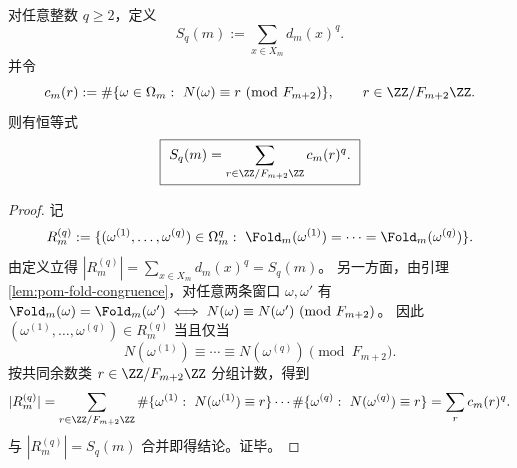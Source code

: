 \begin{proposition}\label{prop:pom-moment-congruence-q}
对任意整数 \(q\ge 2\)，定义
$$
S_q(m):=\sum_{x\in X_m} d_m(x)^q.
$$
并令
$$
c_m(r):=\#\{\omega\in\Omega_m:\ N(\omega)\equiv r\ (\mathrm{mod}\ F_{m+2})\},\qquad r\in\ZZ/F_{m+2}\ZZ.
$$
则有恒等式
$$
\boxed{\ 
S_q(m)=\sum_{r\in\ZZ/F_{m+2}\ZZ} c_m(r)^q.
\ }
$$
\end{proposition}
\begin{proof}
记
$$
R_m^{(q)}:=\{(\omega^{(1)},\dots,\omega^{(q)})\in\Omega_m^q:\ \Fold_m(\omega^{(1)})=\cdots=\Fold_m(\omega^{(q)})\}.
$$
由定义立得 \(|R_m^{(q)}|=\sum_{x\in X_m}d_m(x)^q=S_q(m)\)。
另一方面，由引理 \ref{lem:pom-fold-congruence}，对任意两条窗口 \(\omega,\omega'\) 有
\(
\Fold_m(\omega)=\Fold_m(\omega')\iff N(\omega)\equiv N(\omega')\ (\mathrm{mod}\ F_{m+2})
\)。
因此 \((\omega^{(1)},\dots,\omega^{(q)})\in R_m^{(q)}\) 当且仅当
$$
N(\omega^{(1)})\equiv \cdots \equiv N(\omega^{(q)})\pmod{F_{m+2}}.
$$
按共同余数类 \(r\in\ZZ/F_{m+2}\ZZ\) 分组计数，得到
$$
|R_m^{(q)}|
=\sum_{r\in\ZZ/F_{m+2}\ZZ}\#\{\omega^{(1)}:\ N(\omega^{(1)})\equiv r\}\cdots \#\{\omega^{(q)}:\ N(\omega^{(q)})\equiv r\}
=\sum_{r}c_m(r)^q.
$$
与 \(|R_m^{(q)}|=S_q(m)\) 合并即得结论。证毕。
\end{proof}

